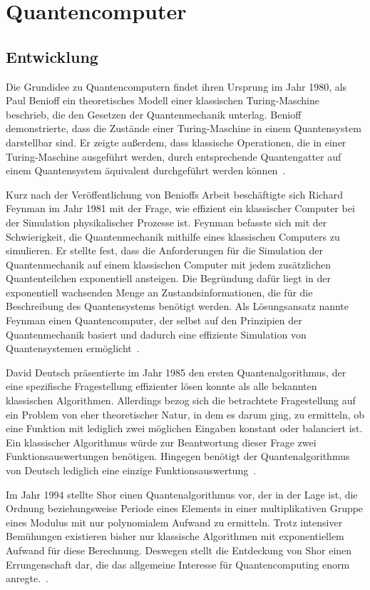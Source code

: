 \section{Quantencomputer}
\subsection{Entwicklung} 
Die Grundidee zu Quantencomputern findet ihren Ursprung im Jahr 1980, 
als Paul Benioff ein theoretisches Modell einer klassischen Turing-Maschine beschrieb, 
die den Gesetzen der Quantenmechanik unterlag.
Benioff demonstrierte, dass die Zustände einer Turing-Maschine in einem Quantensystem darstellbar sind. 
Er zeigte außerdem, dass klassische Operationen, die in einer Turing-Maschine ausgeführt werden, 
durch entsprechende Quantengatter auf einem Quantensystem äquivalent durchgeführt werden können~\cite{benioff1980}.

Kurz nach der Veröffentlichung von Benioffs Arbeit beschäftigte sich Richard Feynman im Jahr 1981 mit der Frage,
wie effizient ein klassischer Computer bei der Simulation physikalischer Prozesse ist.
Feynman befasste sich mit der Schwierigkeit, die Quantenmechanik mithilfe eines klassischen Computers zu simulieren.
Er stellte fest, dass die Anforderungen für die Simulation der Quantenmechanik auf einem klassischen Computer mit jedem zusätzlichen Quantenteilchen exponentiell ansteigen.
Die Begründung dafür liegt in der exponentiell wachsenden Menge an Zustandsinformationen,
die für die Beschreibung des Quantensystems benötigt werden.
Als Lösungsansatz nannte Feynman einen Quantencomputer, 
der selbst auf den Prinzipien der Quantenmechanik basiert und dadurch eine effiziente Simulation von Quantensystemen ermöglicht~\cite{Feynman1982}.

David Deutsch präsentierte im Jahr 1985 den ersten Quantenalgorithmus, 
der eine spezifische Fragestellung effizienter lösen konnte als alle bekannten klassischen Algorithmen. 
Allerdings bezog sich die betrachtete Fragestellung auf ein Problem von eher theoretischer Natur, 
in dem es darum ging, 
zu ermitteln, ob eine Funktion mit lediglich zwei möglichen Eingaben konstant oder balanciert ist.
Ein klassischer Algorithmus würde zur Beantwortung dieser Frage zwei Funktionsauswertungen benötigen. 
Hingegen benötigt der Quantenalgorithmus von Deutsch  
lediglich eine einzige Funktionsauswertung~\cite{deutsch1985}.

Im Jahr 1994 stellte Shor einen Quantenalgorithmus vor, der in der Lage ist, 
die Ordnung beziehungsweise Periode eines Elements in einer multiplikativen Gruppe eines Modulus mit nur polynomialem Aufwand zu ermitteln. 
Trotz intensiver Bemühungen existieren bisher nur klassische Algorithmen mit exponentiellem Aufwand für diese Berechnung. 
Deswegen stellt die Entdeckung von Shor einen Errungenschaft dar, 
die das allgemeine Interesse für Quantencomputing enorm anregte.~\cite{Shor_1997}.

